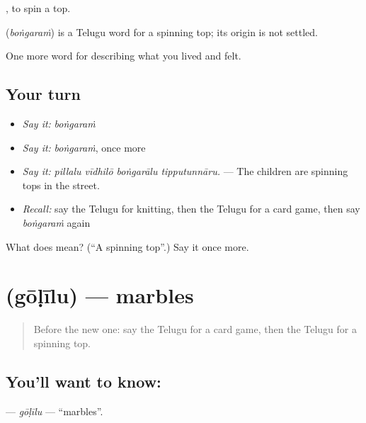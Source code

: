  , to spin a top.

\begin{cousinweb}
\textbf{} (\emph{boṅgaraṁ}) is a Telugu word for a spinning top; its origin is not settled.
\end{cousinweb}

\begin{grammarlens}[title={What you've built}]
One more word for describing what you lived and felt.
\end{grammarlens}

\subsection*{Your turn}
\begin{itemize}
\raggedright
  \item \emph{Say it:} \emph{boṅgaraṁ}
  \item \emph{Say it:} \emph{boṅgaraṁ}, once more
  \item \emph{Say it:} \emph{pillalu vīdhilō boṅgarālu tipputunnāru.} — The children are spinning tops in the street.
  \item \emph{Recall:} say the Telugu for knitting, then the Telugu for a card game, then say \emph{boṅgaraṁ} again
\end{itemize}

\begin{tcolorbox}[breakable,colback=teal!4,colframe=teal!35!black,title={Before you move on}]
What does  mean? (\textquotedblleft{}A spinning top\textquotedblright{}.) Say it once more.
\end{tcolorbox}
\section[\texorpdfstring{\te{గోళీలు} (gōḷīlu)}{గోళీలు (gōḷīlu)}]{ (gōḷīlu) — marbles}

\label{lesson:TE-C537-golilu}



\begin{quote}
Before the new one: say the Telugu for a card game, then the Telugu for a spinning top.
\end{quote}

\subsection*{You'll want to know: }
\textbf{} — \emph{gōḷīlu} — \textquotedblleft{}marbles\textquotedblright{}.

